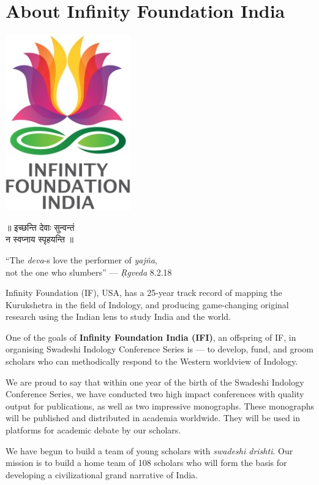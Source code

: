\thispagestyle{empty}

\chapter*{About Infinity Foundation India}

\centerline{\includegraphics[scale=0.3]{figures/logo.png}}\label{about}
\smallskip

\begin{center}
{\dev ॥ इच्छन्ति  देवाः सुन्वन्तं\\[2pt] \hspace{7mm} न स्वप्नाय स्पृहयन्ति ॥}

``The {\sl deva}-s love the performer of {\sl yajña},\\ 
not the one who slumbers'' --- \textsl{Ṛgveda} 8.2.18
\end{center} 

Infinity Foundation (IF), USA, has a 25-year track record of mapping the Kurukshetra in the field of Indology, and producing game-changing original research using the Indian lens to study India and the world. 

One of the goals of {\bf Infinity Foundation India (IFI)}, an offspring of IF, in organising Swadeshi Indology Conference Series is --- to develop, fund, and groom scholars who can methodically respond to the Western worldview of Indology.

We are proud to say that within one year of the birth of the Swadeshi Indology Conference Series, we have conducted two high impact conferences with quality output for publications, as well as two impressive monographs. These monographs will be published and distributed in academia worldwide. They will be used in platforms for academic debate by our scholars.

We have begun to build a team of young scholars with {\sl swadeshi drishti}. Our mission is to build a home team of 108 scholars who will form the basis for developing a civilizational grand narrative of India.
